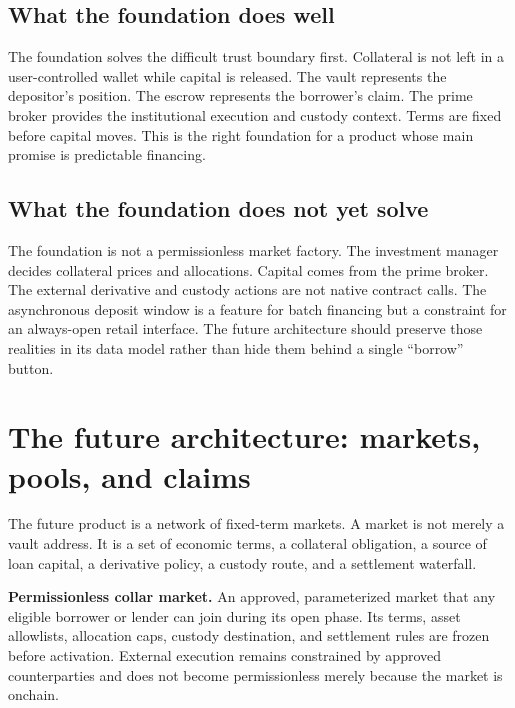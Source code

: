 \documentclass[11pt,oneside]{article}
\begin{document}
\subsection{What the foundation does well}

The foundation solves the difficult trust boundary first. Collateral is not left in a user-controlled wallet while capital is released. The vault represents the depositor's position. The escrow represents the borrower's claim. The prime broker provides the institutional execution and custody context. Terms are fixed before capital moves. This is the right foundation for a product whose main promise is predictable financing.

\subsection{What the foundation does not yet solve}

The foundation is not a permissionless market factory. The investment manager decides collateral prices and allocations. Capital comes from the prime broker. The external derivative and custody actions are not native contract calls. The asynchronous deposit window is a feature for batch financing but a constraint for an always-open retail interface. The future architecture should preserve those realities in its data model rather than hide them behind a single ``borrow'' button.

\section{The future architecture: markets, pools, and claims}

The future product is a network of fixed-term markets. A market is not merely a vault address. It is a set of economic terms, a collateral obligation, a source of loan capital, a derivative policy, a custody route, and a settlement waterfall.

\begin{definitionbox}
\textbf{Permissionless collar market.} An approved, parameterized market that any eligible borrower or lender can join during its open phase. Its terms, asset allowlists, allocation caps, custody destination, and settlement rules are frozen before activation. External execution remains constrained by approved counterparties and does not become permissionless merely because the market is onchain.
\end{definitionbox}
\end{document}
